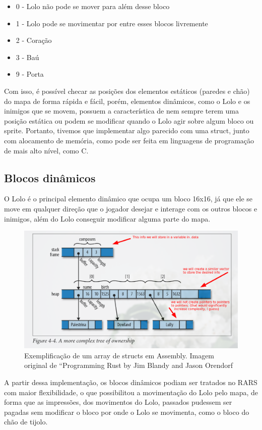 \documentclass[10pt, conference, compsocconf]{IEEEtran}
\begin{document}
\begin{itemize}
    \item 0 - Lolo não pode se mover para além desse bloco
    \item 1 - Lolo pode se movimentar por entre esses blocos livremente
    \item 2 - Coração
    \item 3 - Baú
    \item 9 - Porta
\end{itemize}

Com isso, é possível checar as posições dos elementos estáticos (paredes e chão)
do mapa de forma rápida e fácil, porém, elementos dinâmicos, como o Lolo e os
inimigos que se movem, possuem a característica de nem sempre terem uma posição
estática ou podem se modificar quando o Lolo agir sobre algum bloco ou sprite.
Portanto, tivemos que implementar algo parecido com uma struct, junto com
alocamento de memória, como pode ser feita em linguagens de programação de mais
alto nível, como C.

\subsection{Blocos dinâmicos}{
\label{sec:MIPS}
O Lolo é o principal elemento dinâmico que ocupa um
bloco 16x16, já que ele se move em qualquer direção
que o jogador desejar e interage com os outros blocos
e inimigos, além do Lolo conseguir modificar alguma
parte do mapa.

}

\begin{figure}[htb]
  \begin{center}
   \includegraphics[width=0.3\linewidth]{./Figures/image_8.png}
  \end{center}
  \caption{Exemplificação de um array de structs
em Assembly. Imagem original de “Programming
Rust by Jim Blandy and Jason Orendorf}
  \label{fig:01}
\end{figure}

A partir dessa implementação, os blocos dinâmicos podiam ser tratados no RARS
com maior flexibilidade, o que possibilitou a movimentação do Lolo pelo mapa, de
forma que as impressões, dos movimentos do Lolo, passados pudessem ser pagadas
sem modificar o bloco por onde o Lolo se movimenta, como o bloco do chão de
tijolo.
\end{document}
